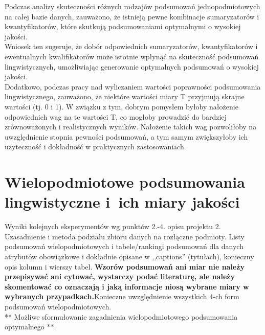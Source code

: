 \documentclass{article}
\begin{document}
\noindent Podczas analizy skuteczności różnych rodzajów podsumowań jednopodmiotowych na całej bazie danych, zauważono, że istnieją pewne kombinacje sumaryzatorów i kwantyfikatorów, które skutkują podsumowaniami optymalnymi o wysokiej jakości. \\

\noindent Wniosek ten sugeruje, że dobór odpowiednich sumaryzatorów, kwantyfikatorów i ewentualnych kwalifikatorów może istotnie wpłynąć na skuteczność podsumowań lingwistycznych, umożliwiając generowanie optymalnych podsumowań o wysokiej jakości. \\

\noindent Dodatkowo, podczas pracy nad wyliczaniem wartości poprawności podsumowania lingwistycznego, zauważono, że niektóre wartości miary T przyjmują skrajne wartości (tj. 0 i 1). W związku z tym, dobrym pomysłem byłoby nałożenie odpowiednich wag na te wartości T, co mogłoby prowadzić do bardziej zrównoważonych i realistycznych wyników. Nałożenie takich wag pozwoliłoby na uwzględnienie stopnia pewności podsumowań, a tym samym zwiększyłoby ich użyteczność i dokładność w praktycznych zastosowaniach.
















\section{Wielopodmiotowe podsumowania lingwistyczne i~ich miary jakości} 
Wyniki kolejnych eksperymentów wg punktów 2.-4. opisu projektu 2. Uzasadnienie i
metoda podziału zbioru danych na rozłączne podmioty. Listy podsumowań
wielopodmiotowych i tabele/rankingi podsumowań dla danych atrybutów obowiązkowe i
dokładnie opisane w ,,captions'' (tytułach), konieczny opis kolumn i wierszy tabel.
{\bf Wzorów podsumowań ani miar nie należy przepisywać ani cytować, wystarczy podać literaturę, ale
należy skomentować co oznaczają i jaką informacje niosą wybrane miary w wybranych
przypadkach.}Konieczne uwzględnienie wszystkich 4-ch form podsumowań wielopodmiotowych. 
\\ 

** Możliwe sformułowanie zagadnienia wielopodmiotowego podsumowania optymalnego **.\\
\\
\end{document}
